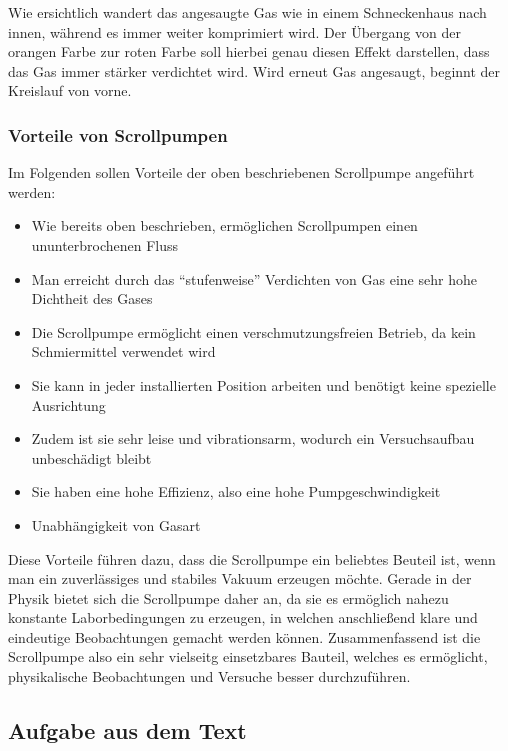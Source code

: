 \documentclass{article}
\begin{document}
Wie ersichtlich wandert das angesaugte Gas wie in einem Schneckenhaus nach innen, während es immer weiter komprimiert wird. Der Übergang von der orangen Farbe zur roten Farbe soll hierbei genau diesen Effekt darstellen, dass das Gas immer stärker verdichtet wird. Wird erneut Gas angesaugt, beginnt der Kreislauf von vorne.

\subsubsection{Vorteile von Scrollpumpen}

\cite{vt}

Im Folgenden sollen Vorteile der oben beschriebenen Scrollpumpe angeführt werden:

\begin{itemize}
    \item Wie bereits oben beschrieben, ermöglichen Scrollpumpen einen ununterbrochenen Fluss
    \item Man erreicht durch das ``stufenweise'' Verdichten von Gas eine sehr hohe Dichtheit des Gases
    \item Die Scrollpumpe ermöglicht einen verschmutzungsfreien Betrieb, da kein Schmiermittel verwendet wird
    \item Sie kann in jeder installierten Position arbeiten und benötigt keine spezielle Ausrichtung
    \item Zudem ist sie sehr leise und vibrationsarm, wodurch ein Versuchsaufbau unbeschädigt bleibt
    \item Sie haben eine hohe Effizienz, also eine hohe Pumpgeschwindigkeit
    \item Unabhängigkeit von Gasart
\end{itemize}

Diese Vorteile führen dazu, dass die Scrollpumpe ein beliebtes Beuteil ist, wenn man ein zuverlässiges und stabiles Vakuum erzeugen möchte. Gerade in der Physik bietet sich die Scrollpumpe daher an, da sie es ermöglich nahezu konstante Laborbedingungen zu erzeugen, in welchen anschließend klare und eindeutige Beobachtungen gemacht werden können. Zusammenfassend ist die Scrollpumpe also ein sehr vielseitg einsetzbares Bauteil, welches es ermöglicht, physikalische Beobachtungen und Versuche besser durchzuführen.

\subsection{Aufgabe aus dem Text}
\end{document}

